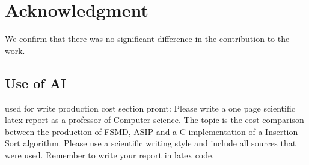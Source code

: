 \documentclass[conference]{IEEEtran}
\begin{document}
\section*{Acknowledgment}

We confirm that there was no significant difference in the contribution to the work.

\printbibliography

\begin{appendices}
\section{Use of AI}
used for write production cost section promt: Please write a one page scientific latex report as a professor of Computer science. The topic is the cost comparison between the production of FSMD, ASIP and a C implementation of a Insertion Sort algorithm. Please use a scientific writing style and include all sources that were used. Remember to write your report in latex code.
\end{appendices}
\end{document}

